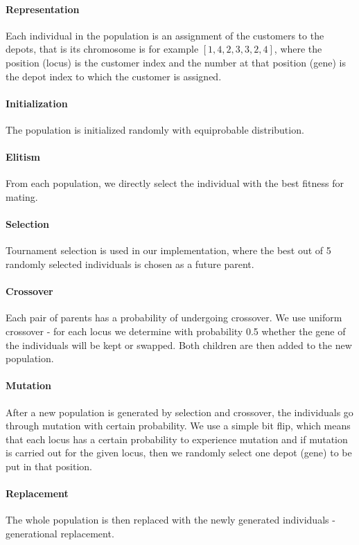 \documentclass[conference]{IEEEtran}
\begin{document}
\paragraph{Representation} Each individual in the population is an assignment of the customers to the depots, that is its chromosome is for example $[1,4,2,3,3,2,4]$, where the position (locus) is the customer index and the number at that position (gene) is the depot index to which the customer is assigned.

\paragraph{Initialization} The population is initialized randomly with equiprobable distribution.

\paragraph{Elitism} From each population, we directly select the individual with the best fitness for mating.

\paragraph{Selection} Tournament selection is used in our implementation, where the best out of 5 randomly selected individuals is chosen as a future parent.

\paragraph{Crossover} Each pair of parents has a probability of undergoing crossover. We use uniform crossover - for each locus we determine with probability 0.5 whether the gene of the individuals will be kept or swapped. Both children are then added to the new population.

\paragraph{Mutation} After a new population is generated by selection and crossover, the individuals go through mutation with certain probability. We use a simple bit flip, which means that each locus has a certain probability to experience mutation and if mutation is carried out for the given locus, then we randomly select one depot (gene) to be put in that position.

\paragraph{Replacement} The whole population is then replaced with the newly generated individuals - generational replacement.
\end{document}
